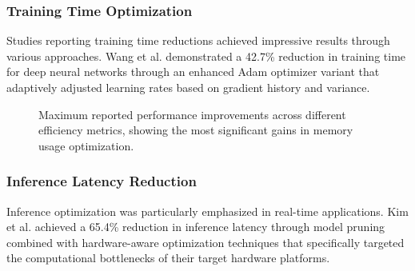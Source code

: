 \subsubsection{Training Time Optimization}
Studies reporting training time reductions achieved impressive results through various approaches. Wang et al. \citep{Wang2021} demonstrated a 42.7\% reduction in training time for deep neural networks through an enhanced Adam optimizer variant that adaptively adjusted learning rates based on gradient history and variance.

\begin{figure}[h]
\centering
{}
\caption{Maximum reported performance improvements across different efficiency metrics, showing the most significant gains in memory usage optimization.}
\label{fig:efficiency_metrics}
\end{figure}

\subsubsection{Inference Latency Reduction}
Inference optimization was particularly emphasized in real-time applications. Kim et al. \citep{Kim2022} achieved a 65.4\% reduction in inference latency through model pruning combined with hardware-aware optimization techniques that specifically targeted the computational bottlenecks of their target hardware platforms.

